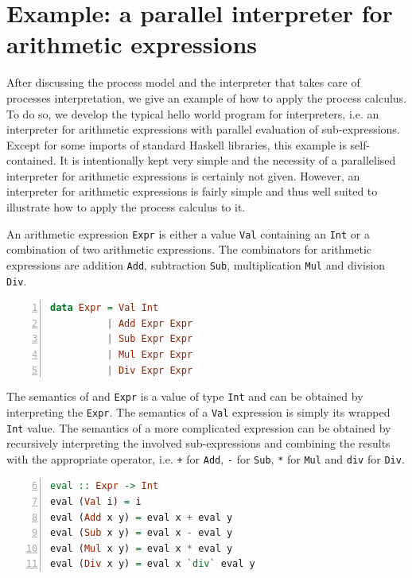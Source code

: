 \section{Example: a parallel interpreter for arithmetic expressions}
\label{chp:example}
After discussing the process model and the interpreter that takes care of processes interpretation, we give an example of how to apply the process calculus. To do so, we develop the typical hello world program for interpreters, i.e. an interpreter for arithmetic expressions with parallel evaluation of sub-expressions. Except for some imports of standard \textsf{Haskell} libraries, this example is self-contained. It is intentionally kept very simple and the necessity of a parallelised interpreter for arithmetic expressions is certainly not given. However, an interpreter for arithmetic expressions is fairly simple and thus well suited to illustrate how to apply the process calculus to it.

An arithmetic expression \texttt{Expr} is either a value \texttt{Val} containing an \texttt{Int} or a combination of two arithmetic expressions. The combinators for arithmetic expressions are addition \texttt{Add}, subtraction \texttt{Sub}, multiplication \texttt{Mul} and division \texttt{Div}.
\begin{lstlisting}[language=Haskell, caption=Data model for the representation of arithmetic expressions., label=lst:arith_model, numbers=left, frame=bt]
data Expr = Val Int
          | Add Expr Expr
          | Sub Expr Expr
          | Mul Expr Expr
          | Div Expr Expr
\end{lstlisting}

The semantics of and \texttt{Expr} is a value of type \texttt{Int} and can be obtained by interpreting the \texttt{Expr}. The semantics of a \texttt{Val} expression is simply its wrapped \texttt{Int} value. The semantics of a more complicated expression can be obtained by recursively interpreting the involved sub-expressions and combining the results with the appropriate operator, i.e. \texttt{+} for \texttt{Add}, \texttt{-} for \texttt{Sub}, \texttt{*} for \texttt{Mul} and \texttt{div} for \texttt{Div}.
\begin{lstlisting}[language=Haskell, caption=Implementation of an interpreter for arithmetic expressions., label=lst:arith_eval, numbers=left, frame=bt, firstnumber=6]
eval :: Expr -> Int
eval (Val i) = i
eval (Add x y) = eval x + eval y
eval (Sub x y) = eval x - eval y
eval (Mul x y) = eval x * eval y
eval (Div x y) = eval x `div` eval y
\end{lstlisting}

